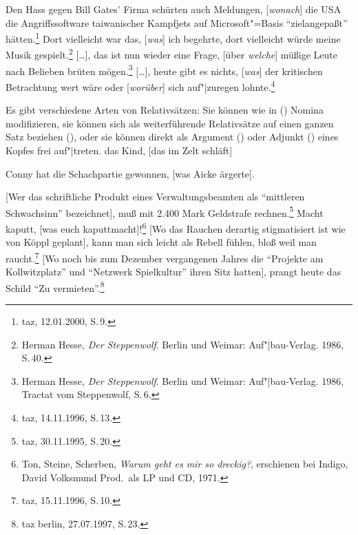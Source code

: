{\ex Den Hass gegen Bill Gates' Firma schürten auch Meldungen, [\hspace{-.2ex}\emph{wonach}] die USA die Angriffssoftware
      taiwanischer Kampfjets auf Microsoft"=Basis "`ziel\-an\-ge\-paßt"' hätten.\footnote{
        taz, 12.01.2000, S.\,9.
      }
\ex Dort vielleicht war das, [\hspace{-.2ex}\emph{was}] ich begehrte, dort vielleicht würde meine Musik gespielt.\footnote{
                Herman Hesse, \emph{Der Steppenwolf}. Berlin und Weimar: Auf"|bau-Verlag. 1986, S.\,40.
	}\label{bsp-meine-musik}
\ex {}[\ldots], das ist nun wieder eine Frage, [über \emph{welche}] müßige Leute nach Belieben brüten
	mögen.\footnote{
                Herman Hesse, \emph{Der Steppenwolf}. Berlin und Weimar: Auf"|bau-Verlag. 1986, Tractat vom Steppenwolf, S.\,6.
	} 
\ex {}[\ldots], heute gibt es nichts, [\hspace{-.2ex}\emph{was}] der kritischen Betrachtung wert wäre oder
      \mbox{[\hspace{-.2ex}\emph{worüber}]} sich auf"|zuregen lohnte.\footnote{
	taz, 14.11.1996, S.\,13.
      }
\zl
{}

\noindent
Es gibt verschiedene Arten von Relativsätzen: Sie können wie in () Nomina modifizieren,
sie können sich als weiterführende Relativsätze auf einen ganzen Satz beziehen (), oder sie
können direkt als Argument () oder Adjunkt () eines Kopfes
frei auf"|treten.
\ea
das Kind, [das im Zelt schläft]
\z

\ea
Conny hat die Schachpartie gewonnen, [was Aicke ärgerte].
\z                                              

\eal
\label{bsp-frei-rs-subj}
\ex {}[Wer das schriftliche Produkt eines Verwaltungsbeamten als "`mittleren Schwachsinn"' bezeichnet],
      muß mit 2.400 Mark Geldstrafe rechnen.\footnote{
        taz, 30.11.1995, S.\,20.}
\ex Macht kaputt, [was euch kaputtmacht]!\footnote{
        Ton, Steine, Scherben, \emph{Warum geht es mir so dreckig?}, erschienen bei Indigo, David Volksmund Prod.\ als LP und CD, 1971.
      }
\zl
\eal
\label{bsp-frei-rs-mod}
\ex {}[Wo das Rauchen derartig stigmatisiert ist wie von Köppl geplant], 
      kann man sich leicht als Rebell fühlen, bloß weil man raucht.\footnote{
	taz, 15.11.1996, S.\,10.
}\label{bsp-rauchen-stigmatisiert}
\ex {}[Wo noch bis zum Dezember vergangenen Jahres die "`Projekte am Kollwitzplatz"' und
      "`Netzwerk Spielkultur"' ihren Sitz hatten], prangt heute das Schild "`Zu vermieten"'.\footnote{
        taz berlin, 27.07.1997, S.\,23.
        }
\zl
}%

